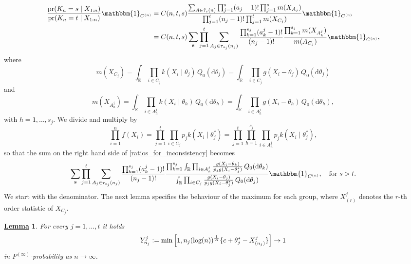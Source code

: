 \documentclass[12pt]{article}
\newtheorem{Lem}{\underline{\bf Lemma}}
\def \d {\mathrm{d}}
\def\log{\hbox{log}}
\begin{document}
\begin{equation}\label{ratios_for_inconsistency}
\begin{aligned}
\frac{\text{pr}(K_n = s \mid X_{1:n})}{\text{pr}(K_n = t \mid X_{1:n})}\mathbbm{1}_{C^{(n)}} & = C(n, t, s)\frac{\sum_{A \in \tilde{\tau}_s(n)}\prod_{j=1}^s(a_j-1)!\prod_{j=1}^s m(X_{A_j})}{\prod_{j = 1}^t(n_j-1)!\prod_{j = 1}^tm(X_{C_j})}\mathbbm{1}_{C^{(n)}} \\
&= C(n, t, s)\sum_{\textbf{s}}\prod_{j = 1}^t\sum_{A_j \in \tau_{s_j}(n_j)}\frac{\prod_{k=1}^{s_j}(a^j_k-1)!}{(n_j-1)!}\frac{\prod_{k=1}^{s_j} m(X_{A^j_k})}{m(A_{C_j})}\mathbbm{1}_{C^{(n)}},
\end{aligned}
\end{equation}
where
\[
m(X_{C_j}) = \int_{\mathbb{R}}\prod_{i \in C_j}k(X_i \mid \theta_j) \, Q_0(\d \theta_j) = \int_{\mathbb{R}}\prod_{i \in C_j}g(X_i - \theta_j) \, Q_0(\d \theta_j)
\]
and
\[
m(X_{A^j_h}) = \int_{\mathbb{R}}\prod_{i \in A^j_h}k(X_i \mid \theta_h) \, Q_0(\d \theta_h) = \int_{\mathbb{R}}\prod_{i \in A^j_h}g(X_i - \theta_h) \, Q_0(\d \theta_h),
\]
with $h = 1, \dots, s_j$. We divide and multiply by
\[
\prod_{i = 1}^nf(X_i) = \prod_{j = 1}^t\prod_{i \in C_j}p_jk(X_i \mid \theta_j^*) = \prod_{j = 1}^t\prod_{h = 1}^{s_j}\prod_{i \in A_h^j}p_jk(X_i \mid \theta_j^*),
\]
so that the sum on the right hand side of \eqref{ratios_for_inconsistency} becomes
\begin{equation}\label{object}
\sum_{\textbf{s}}\prod_{j = 1}^t\sum_{A_j \in \tau_{s_j}(n_j)}\frac{\prod_{k=1}^{s_j}(a^j_k-1)!}{(n_j-1)!}\frac{\prod_{k = 1}^{s_j}\int_{\mathbb{R}}\prod_{i \in A^j_k}\frac{g(X_i - \theta_k)}{p_jg(X_i-\theta_j^*)} \, Q_0(\d \theta_k)}{\int_{\mathbb{R}}\prod_{i \in C_j}\frac{g(X_i - \theta_j)}{p_jg(X_i-\theta_j^*)} \, Q_0(\d \theta_j)}\mathbbm{1}_{C^{(n)}}, \quad \text{for } s > t.
\end{equation}
We start with the denominator. The next lemma specifies the behaviour of the maximum for each group, where $X^j_{(r)}$ denotes the $r$-th order statistic of $X_{C_j}$.
\begin{Lem}\label{lemma:Max}
For every $j = 1, \dots , t$ it holds
\[
Y^j_{n_j} := \min \left[ 1, n_j(\log(n))^{\frac{1}{2t}}\{c+\theta_j^*-X^j_{(n_j)}\} \right] \to 1
\]
in $P^{(\infty)}$-probability as $n \to \infty$.
\end{Lem}
\end{document}

